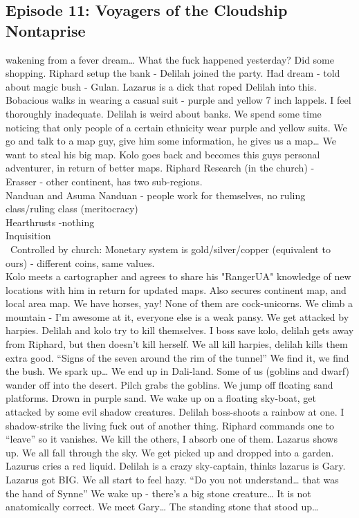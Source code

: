 \subsection{Episode 11: Voyagers of the Cloudship Nontaprise}
wakening from a fever dream…\medskip
What the fuck happened yesterday? Did some shopping. Riphard setup the bank - Delilah joined the party. Had dream - told about magic bush - Gulan. Lazarus is a dick that roped Delilah into this. Bobacious walks in wearing a casual suit - purple and yellow 7 inch lappels. I feel thoroughly inadequate. Delilah is weird about banks. We spend some time noticing that only people of a certain ethnicity wear purple and yellow suits. We go and talk to a map guy, give him some information, he gives us a map… We want to steal his big map. Kolo goes back and becomes this guys personal adventurer, in return of better maps.\medskip
Riphard Research (in the church) -\\
Erasser - other continent, has two sub-regions.\\
Nanduan and Asuma Nanduan - people work for themselves, no ruling class/ruling class (meritocracy)\\
Hearthrusts -nothing\\
Inquisition\\\
Controlled by church: Monetary system is gold/silver/copper (equivalent to ours) - different coins, same values.\\\medskip
Kolo meets a cartographer and agrees to share his "RangerUA" knowledge of new locations with him in return for updated maps. Also secures continent map, and local area map.\medskip
We have horses, yay! None of them are cock-unicorns.\medskip
We climb a mountain - I’m awesome at it, everyone else is a weak pansy.\medskip
We get attacked by harpies. Delilah and kolo try to kill themselves. I boss save kolo, delilah gets away from Riphard, but then doesn’t kill herself.\medskip
We all kill harpies, delilah kills them extra good.\medskip
“Signs of the seven around the rim of the tunnel”\medskip
We find it, we find the bush. We spark up… We end up in Dali-land.\medskip
Some of us (goblins and dwarf) wander off into the desert. Pilch grabs the goblins.\medskip
We jump off floating sand platforms. Drown in purple sand.\medskip
We wake up on a floating sky-boat, get attacked by some evil shadow creatures.\medskip
Delilah boss-shoots a rainbow at one.\medskip
I shadow-strike the living fuck out of another thing.\medskip
Riphard commands one to “leave” so it vanishes.\medskip
We kill the others, I absorb one of them.\medskip
Lazarus shows up. We all fall through the sky.\medskip
We get picked up and dropped into a garden. Lazurus cries a red liquid.\medskip
Delilah is a crazy sky-captain, thinks lazarus is Gary.\medskip
Lazarus got BIG.\medskip
We all start to feel hazy. “Do you not understand… that was the hand of Synne”\medskip
We wake up - there’s a big stone creature… It is not anatomically correct.\medskip
We meet Gary… The standing stone that stood up…